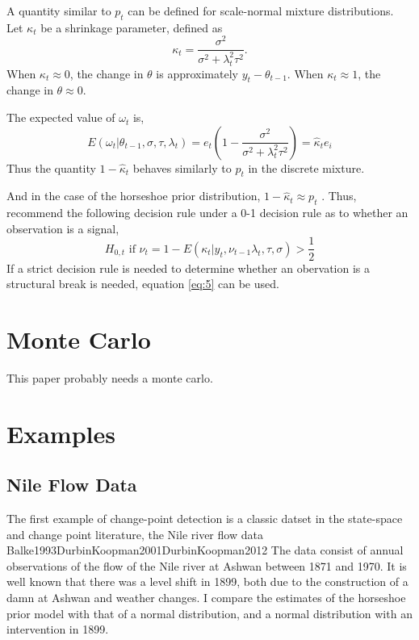 \documentclass{article}
\begin{document}
A quantity similar to $p_{t}$ can be defined for scale-normal mixture distributions.
Let $\kappa_{t}$ be a shrinkage parameter, defined as
\begin{equation}
  \label{eq:3}
  \kappa_{t} = \frac{\sigma^{2}}{\sigma^{2} + \lambda^{2}_{t} \tau^{2}} \text{.}
\end{equation}
When $\kappa_{t} \approx 0$, the change in $\theta$ is approximately $y_{t} - \theta_{t-1}$.
When $\kappa_{t} \approx 1$, the change in $\theta \approx 0$.

The expected value of $\omega_{t}$ is,
\begin{equation}
  \label{eq:10}
  E(\omega_{t} | \theta_{t - 1}, \sigma, \tau, \lambda_{t}) = e_{t}
  \left(
    1 - \frac{\sigma^{2}}{\sigma^{2} + \lambda^{2}_{t} \tau^{2}}
  \right)  = \hat \kappa_{t} e_{i}
\end{equation}
Thus the quantity $1 - \hat \kappa_{t}$ behaves similarly to $p_{t}$ in the discrete mixture.

And in the case of the horseshoe prior distribution, $1 - \hat \kappa_{t} \approx p_{t}$ \parencite[474]{CarvalhoPolsonScott2010}.
Thus, \textcite{CarvalhoPolsonScott2010} recommend the following  decision rule under a 0-1 decision rule as to whether an observation is a signal,
\begin{equation}
  \label{eq:5}
  \text{$H_{0,t}$ if $\nu_{t} = 1 - E(\kappa_{t}|y_{t}, \nu_{t-1} \lambda_{t}, \tau, \sigma) > \frac{1}{2}$}
\end{equation}
If a strict decision rule is needed to determine whether an obervation is a structural break is needed, equation \eqref{eq:5} can be used.

\section{Monte Carlo}
\label{sec:monte-carlo}

This paper probably needs a monte carlo.

\section{Examples}
\label{sec:examples}

\subsection{Nile Flow Data}
\label{sec:nile}

The first example of change-point detection is a classic datset in the state-space and change point literature, the Nile river flow data \textcite{Cobb1978}{Balke1993}{DurbinKoopman2001}{DurbinKoopman2012}
The data consist of annual observations of the flow of the Nile river at Ashwan between 1871 and 1970.
It is well known that there was a level shift in 1899, both due to the construction of a damn at Ashwan and weather changes.
I compare the estimates of the horseshoe prior model with that of a normal distribution, and a normal distribution with an intervention in 1899.
\end{document}

